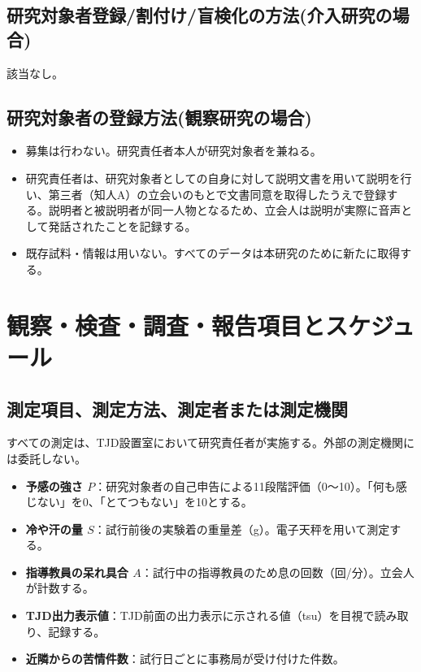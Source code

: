 \documentclass{kyodai-protocol}
\begin{document}
\subsection{研究対象者登録/割付け/盲検化の方法(介入研究の場合)}

該当なし。

\subsection{研究対象者の登録方法(観察研究の場合)}

\begin{itemize}
\item 募集は行わない。研究責任者本人が研究対象者を兼ねる。
\item 研究責任者は、研究対象者としての自身に対して説明文書を用いて説明を行い、第三者（知人A）の立会いのもとで文書同意を取得したうえで登録する。説明者と被説明者が同一人物となるため、立会人は説明が実際に音声として発話されたことを記録する。
\item 既存試料・情報は用いない。すべてのデータは本研究のために新たに取得する。
\end{itemize}

\section{観察・検査・調査・報告項目とスケジュール}

\subsection{測定項目、測定方法、測定者または測定機関}

すべての測定は、TJD設置室において研究責任者が実施する。外部の測定機関には委託しない。

\begin{itemize}
\item \textbf{予感の強さ $P$}：研究対象者の自己申告による11段階評価（0〜10）。「何も感じない」を0、「とてつもない」を10とする。
\item \textbf{冷や汗の量 $S$}：試行前後の実験着の重量差（g）。電子天秤を用いて測定する。
\item \textbf{指導教員の呆れ具合 $A$}：試行中の指導教員のため息の回数（回/分）。立会人が計数する。
\item \textbf{TJD出力表示値}：TJD前面の出力表示に示される値（tsu）を目視で読み取り、記録する。
\item \textbf{近隣からの苦情件数}：試行日ごとに事務局が受け付けた件数。
\end{itemize}
\end{document}
